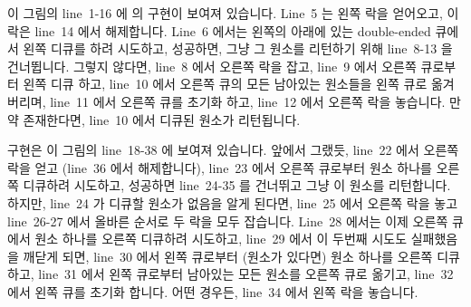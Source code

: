 이 그림의 line~1-16 에  의 구현이 보여져 있습니다.
Line~5 는 왼쪽 락을 얻어오고, 이 락은 line~14 에서 해제합니다.
Line~6 에서는 왼쪽의 아래에 있는 double-ended 큐에서 왼쪽 디큐를 하려 시도하고,
성공하면, 그냥 그 원소를 리턴하기 위해 line~8-13 을 건너뜁니다.
그렇지 않다면, line~8 에서 오른쪽 락을 잡고, line~9 에서 오른쪽 큐로부터 왼쪽
디큐 하고, line~10 에서 오른쪽 큐의 모든 남아있는 원소들을 왼쪽 큐로
옮겨버리며, line~11 에서 오른쪽 큐를 초기화 하고, line~12 에서 오른쪽 락을
놓습니다.
만약 존재한다면, line~10 에서 디큐된 원소가 리턴됩니다.

 구현은 이 그림의 line~18-38 에 보여져 있습니다.
앞에서 그랬듯, line~22 에서 오른쪽 락을 얻고 (line~36 에서 해제합니다), line~23
에서 오른쪽 큐로부터 원소 하나를 오른쪽 디큐하려 시도하고, 성공하면 line~24-35
를 건너뛰고 그냥 이 원소를 리턴합니다.
하지만, line~24 가 디큐할 원소가 없음을 알게 된다면, line~25 에서 오른쪽 락을
놓고 line~26-27 에서 올바른 순서로 두 락을 모두 잡습니다.
Line~28 에서는 이제 오른쪽 큐에서 원소 하나를 오른쪽 디큐하려 시도하고, line~29
에서 이 두번째 시도도 실패했음을 깨닫게 되면, line~30 에서 왼쪽 큐로부터
(원소가 있다면) 원소 하나를 오른쪽 디큐하고, line~31 에서 왼쪽 큐로부터
남아있는 모든 원소를 오른쪽 큐로 옮기고, line~32 에서 왼쪽 큐를 초기화 합니다.
어떤 경우든, line~34 에서 왼쪽 락을 놓습니다.

